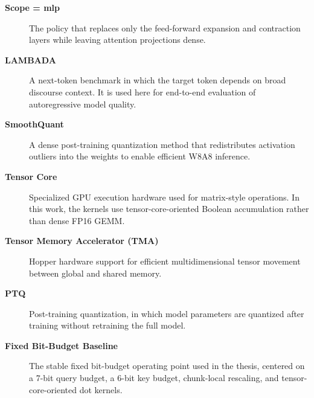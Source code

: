 \begin{description}
    \item[\textbf{Scope = mlp}]
    The policy that replaces only the feed-forward expansion and contraction layers while leaving attention projections dense.

    \item[\textbf{LAMBADA}]
    A next-token benchmark in which the target token depends on broad discourse context. It is used here for end-to-end evaluation of autoregressive model quality.

    \item[\textbf{SmoothQuant}]
    A dense post-training quantization method that redistributes activation outliers into the weights to enable efficient W8A8 inference.

    \item[\textbf{Tensor Core}]
    Specialized GPU execution hardware used for matrix-style operations. In this work, the kernels use tensor-core-oriented Boolean accumulation rather than dense FP16 GEMM.

    \item[\textbf{Tensor Memory Accelerator (TMA)}]
    Hopper hardware support for efficient multidimensional tensor movement between global and shared memory.

    \item[\textbf{PTQ}]
    Post-training quantization, in which model parameters are quantized after training without retraining the full model.

    \item[\textbf{Fixed Bit-Budget Baseline}]
    The stable fixed bit-budget operating point used in the thesis, centered on a 7-bit query budget, a 6-bit key budget, chunk-local rescaling, and tensor-core-oriented dot kernels.
\end{description}
